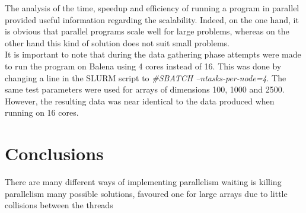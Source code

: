 \documentclass[letterpaper,12pt]{article}
\begin{document}
The analysis of the time, speedup and efficiency of running a program in parallel provided useful information regarding the scalability. Indeed, on the one hand, it is obvious that parallel programs scale well for large problems, whereas on the other hand this kind of solution does not suit small problems.\\

It is important to note that during the data gathering phase attempts were made to run the program on Balena using 4 cores instead of 16. This was done by changing a line in the SLURM script to \textit{\#SBATCH --ntasks-per-node=4}. The same test parameters were used for arrays of dimensions 100, 1000 and 2500. However, the resulting data was near identical to the data produced when running on 16 cores. 



\section{Conclusions}
There are many different ways of implementing parallelism 
waiting is killing parallelism
many possible solutions, favoured one for large arrays due to little collisions between the threads



\newpage




\end{document}
